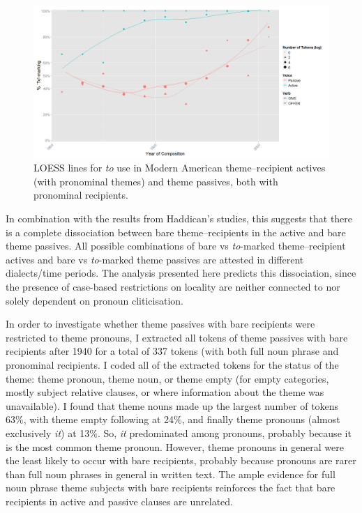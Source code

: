 \begin{figure}[ht!]

{\centering \includegraphics[width=\linewidth]{../images/recpro_to_am} 

}

\caption{LOESS lines for \textit{to} use in Modern American theme--recipient actives (with pronominal themes) and theme passives, both with pronominal recipients.\label{fig:amdata}}\label{fig:amtoset-graph}
\end{figure}

In combination with the results from Haddican's studies, this suggests that there is a complete dissociation between bare theme--recipients in the active and bare theme passives. All possible combinations of bare vs \textit{to}-marked theme--recipient actives and bare vs \textit{to}-marked theme passives are attested in different dialects/time periods. The analysis presented here predicts this dissociation, since the presence of case-based restrictions on locality are neither connected to nor solely dependent on pronoun cliticisation.

In order to investigate whether theme passives with bare recipients were restricted to theme pronouns, I extracted all tokens of theme passives with bare recipients after 1940 for a total of 337 tokens (with both full noun phrase and pronominal recipients. I coded all of the extracted tokens for the status of the theme: theme pronoun, theme noun, or theme empty (for empty categories, mostly subject relative clauses, or where information about the theme was unavailable). I found that theme nouns made up the largest number of tokens 63\%, with theme empty following at 24\%, and finally theme pronouns (almost exclusively \textit{it}) at 13\%. So, \textit{it} predominated among pronouns, probably because it is the most common theme pronoun. However, theme pronouns in general were the least likely to occur with bare recipients, probably because pronouns are rarer than full noun phrases in general in written text. The ample evidence for full noun phrase theme subjects with bare recipients reinforces the fact that bare recipients in active and passive clauses are unrelated.

